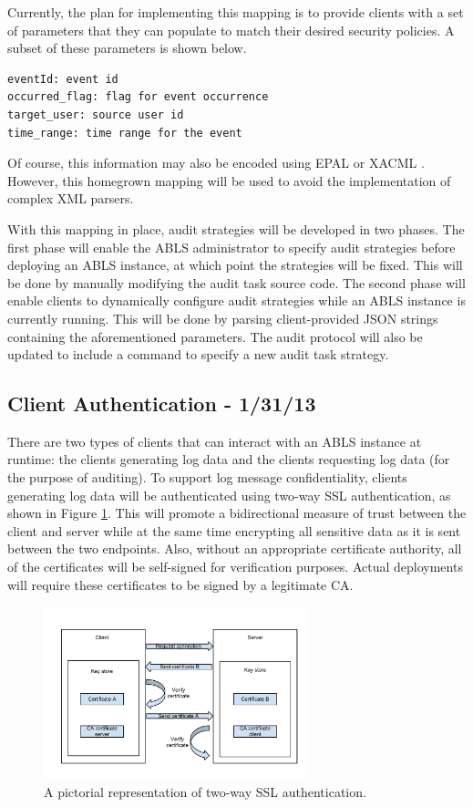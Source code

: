 \documentclass{sig-alternate}
\begin{document}
Currently, the plan for implementing this mapping is to provide clients with a set of parameters that they can populate to
match their desired security policies. A subset of these parameters is shown below.
\begin{lstlisting}
eventId: event id
occurred_flag: flag for event occurrence
target_user: source user id
time_range: time range for the event
\end{lstlisting}

Of course, this information may also be encoded using EPAL or XACML \cite{Anderson2005-ComparisonEAPL_XACML}.
However, this homegrown mapping will be used to avoid the implementation of complex XML parsers. 

With this mapping in place, audit strategies will be developed in two phases. The first phase will enable the 
ABLS administrator to specify audit strategies before deploying an ABLS instance, at which point the strategies 
will be fixed. This will be done by manually modifying the audit task source code. The second phase will enable 
clients to dynamically configure audit strategies while an ABLS instance is currently running. This will be done 
by parsing client-provided JSON strings containing the aforementioned parameters. The audit protocol will also 
be updated to include a command to specify a new audit task strategy.

\subsection{Client Authentication - 1/31/13}
\label{sec:auth}
There are two types of clients that can interact with an ABLS instance at runtime: the clients generating log data and the
clients requesting log data (for the purpose of auditing). To support log message confidentiality, clients generating 
log data will be authenticated using two-way SSL authentication, as shown in Figure \ref{fig:ssl}. This will 
promote a bidirectional measure of trust between the client and server while at the same time encrypting 
all sensitive data as it is sent between the two endpoints. Also, without an appropriate certificate authority, all
of the certificates will be self-signed for verification purposes. Actual deployments will require these certificates
to be signed by a legitimate CA.

\begin{figure}[ht!]
\begin{center}
\includegraphics[width=3in]{images/two_way_ssl.pdf}
\caption{A pictorial representation of two-way SSL authentication. }
\label{fig:ssl}
\end{center}
\end{figure}
\end{document}
